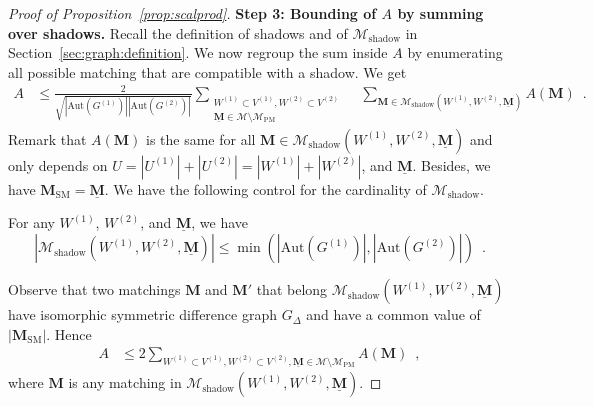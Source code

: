 \documentclass[final]{colt2026}
\newcommand{\1}{\mathbf{1}}
\begin{document}
\begin{proof}[Proof of Proposition~\ref{prop:scalprod}]
\noindent
{\bf Step 3: Bounding of $A$ by summing over shadows.} Recall the definition of shadows and of $\mathcal M_{\mathrm{shadow}}$ in Section~\ref{sec:graph:definition}. We now regroup the sum inside $A$ by enumerating  all possible matching  that are compatible with a  shadow. We get 
\begin{align*}
       A &\leq  \frac{2}{\sqrt{|\mathrm{Aut}(G^{(1)})| |\mathrm{Aut}(G^{(2)})|}} 
       \sum_{\substack{W^{(1)} \subset V^{(1)}, W^{(2)} \subset V^{(2)}\\ \underline{\mathbf M} \in \mathcal M\setminus \mathcal M_{\mathrm{PM}}}}\quad 
       \sum_{\mathbf M \in \mathcal M_{\mathrm{shadow}}(W^{(1)},W^{(2)}, \underline{\mathbf M})} A(\mathbf M)\enspace .
\end{align*}
Remark that $A(\mathbf M)$ is the same for all $\mathbf M \in \mathcal M_{\mathrm{shadow}}(W^{(1)},W^{(2)}, \underline{\mathbf M})$ and only depends on $U=|U^{(1)}|+ |U^{(2)}|=|W^{(1)}|+|W^{(2)}|$, and $\underline{\mathbf{M}}$. Besides, we have $\mathbf M_{\mathrm{SM}}=\underline{\mathbf M}$. 
We have the following control for the cardinality of $\mathcal M_{\mathrm{shadow}}$.
\begin{lemma}\label{lem:shadow}
For any $W^{(1)}$, $W^{(2)}$, and $\underline{\mathbf M}$, we have
    $$|\mathcal M_{\mathrm{shadow}}(W^{(1)}, W^{(2)}, \underline{\mathbf M} )| \leq \min(|\mathrm{Aut}(G^{(1)})|, |\mathrm{Aut}(G^{(2)})|)\enspace .$$
\end{lemma}
Observe that two matchings $\mathbf M$ and $\mathbf M'$ that belong $\mathcal M_{\mathrm{shadow}}(W^{(1)},W^{(2)}, \underline{\mathbf M})$ have isomorphic symmetric difference graph $G_{\Delta}$ and have a common value of $|\mathbf M_{\mathrm{SM}}|$. Hence
\begin{align}
       A &\leq  2 
       \sum_{W^{(1)} \subset V^{(1)}, W^{(2)} \subset V^{(2)}, \underline{\mathbf M} \in \mathcal M\setminus \mathcal M_{\mathrm{PM}}}  A(\mathbf M)\enspace ,\label{eqn:sum for proof sketch}
\end{align}
where $\mathbf{M}$ is any matching in   $\mathcal M_{\mathrm{shadow}}(W^{(1)},W^{(2)}, \underline{\mathbf M})$.



\end{proof}
\end{document}

